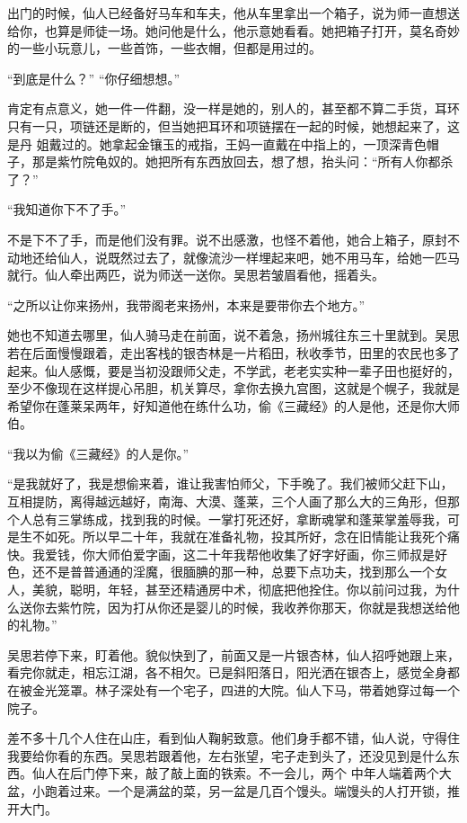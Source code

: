 出门的时候，仙人已经备好马车和车夫，他从车里拿出一个箱子，说为师一直想送给你，也算是师徒一场。她问他是什么，他示意她看看。她把箱子打开，莫名奇妙的一些小玩意儿，一些首饰，一些衣帽，但都是用过的。

“到底是什么？” “你仔细想想。”

肯定有点意义，她一件一件翻，没一样是她的，别人的，甚至都不算二手货，耳环只有一只，项链还是断的，但当她把耳环和项链摆在一起的时候，她想起来了，这是丹
姐戴过的。她拿起金镶玉的戒指，王妈一直戴在中指上的，一顶深青色帽子，那是紫竹院龟奴的。她把所有东西放回去，想了想，抬头问：“所有人你都杀了？”

“我知道你下不了手。”

不是下不了手，而是他们没有罪。说不出感激，也怪不着他，她合上箱子，原封不动地还给仙人，说既然过去了，就像流沙一样埋起来吧，她不用马车，给她一匹马就行。仙人牵出两匹，说为师送一送你。吴思若皱眉看他，摇着头。

“之所以让你来扬州，我带阁老来扬州，本来是要带你去个地方。”

她也不知道去哪里，仙人骑马走在前面，说不着急，扬州城往东三十里就到。吴思若在后面慢慢跟着，走出客栈的银杏林是一片稻田，秋收季节，田里的农民也多了起来。仙人感慨，要是当初没跟师父走，不学武，老老实实种一辈子田也挺好的，至少不像现在这样提心吊胆，机关算尽，拿你去换九宫图，这就是个幌子，我就是希望你在蓬莱呆两年，好知道他在练什么功，偷《三藏经》的人是他，还是你大师伯。

“我以为偷《三藏经》的人是你。”

“是我就好了，我是想偷来着，谁让我害怕师父，下手晚了。我们被师父赶下山，互相提防，离得越远越好，南海、大漠、蓬莱，三个人画了那么大的三角形，但那个人总有三掌练成，找到我的时候。一掌打死还好，拿断魂掌和蓬莱掌羞辱我，可是生不如死。所以早二十年，我就在准备礼物，投其所好，念在旧情能让我死个痛快。我爱钱，你大师伯爱字画，这二十年我帮他收集了好字好画，你三师叔是好色，还不是普普通通的淫魔，很腼腆的那一种，总要下点功夫，找到那么一个女人，美貌，聪明，年轻，甚至还精通房中术，彻底把他拴住。你以前问过我，为什么送你去紫竹院，因为打从你还是婴儿的时候，我收养你那天，你就是我想送给他的礼物。”

吴思若停下来，盯着他。貌似快到了，前面又是一片银杏林，仙人招呼她跟上来，看完你就走，相忘江湖，各不相欠。已是斜阳落日，阳光洒在银杏上，感觉全身都在被金光笼罩。林子深处有一个宅子，四进的大院。仙人下马，带着她穿过每一个院子。

差不多十几个人住在山庄，看到仙人鞠躬致意。他们身手都不错，仙人说，守得住我要给你看的东西。吴思若跟着他，左右张望，宅子走到头了，还没见到是什么东西。仙人在后门停下来，敲了敲上面的铁索。不一会儿，两个
中年人端着两个大盆，小跑着过来。一个是满盆的菜，另一盆是几百个馒头。端馒头的人打开锁，推开大门。

